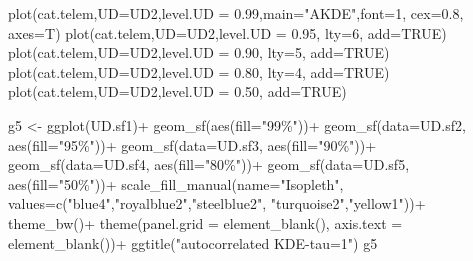 \documentclass[
  letterpaper,
]{book}
\newenvironment{Shaded}{\begin{snugshade}}{\end{snugshade}}
\newcommand{\AttributeTok}[1]{\textcolor[rgb]{0.40,0.45,0.13}{#1}}
\newcommand{\ConstantTok}[1]{\textcolor[rgb]{0.56,0.35,0.01}{#1}}
\newcommand{\DecValTok}[1]{\textcolor[rgb]{0.68,0.00,0.00}{#1}}
\newcommand{\FloatTok}[1]{\textcolor[rgb]{0.68,0.00,0.00}{#1}}
\newcommand{\FunctionTok}[1]{\textcolor[rgb]{0.28,0.35,0.67}{#1}}
\newcommand{\NormalTok}[1]{\textcolor[rgb]{0.00,0.23,0.31}{#1}}
\newcommand{\OtherTok}[1]{\textcolor[rgb]{0.00,0.23,0.31}{#1}}
\newcommand{\SpecialCharTok}[1]{\textcolor[rgb]{0.37,0.37,0.37}{#1}}
\newcommand{\StringTok}[1]{\textcolor[rgb]{0.13,0.47,0.30}{#1}}
\begin{document}
\begin{Shaded}
\begin{Highlighting}[]
\FunctionTok{plot}\NormalTok{(cat.telem,}\AttributeTok{UD=}\NormalTok{UD2,}\AttributeTok{level.UD =} \FloatTok{0.99}\NormalTok{,}\AttributeTok{main=}\StringTok{"AKDE"}\NormalTok{,}\AttributeTok{font=}\DecValTok{1}\NormalTok{, }\AttributeTok{cex=}\FloatTok{0.8}\NormalTok{, }\AttributeTok{axes=}\NormalTok{T)}
\FunctionTok{plot}\NormalTok{(cat.telem,}\AttributeTok{UD=}\NormalTok{UD2,}\AttributeTok{level.UD =} \FloatTok{0.95}\NormalTok{, }\AttributeTok{lty=}\DecValTok{6}\NormalTok{, }\AttributeTok{add=}\ConstantTok{TRUE}\NormalTok{)}
\FunctionTok{plot}\NormalTok{(cat.telem,}\AttributeTok{UD=}\NormalTok{UD2,}\AttributeTok{level.UD =} \FloatTok{0.90}\NormalTok{, }\AttributeTok{lty=}\DecValTok{5}\NormalTok{, }\AttributeTok{add=}\ConstantTok{TRUE}\NormalTok{)}
\FunctionTok{plot}\NormalTok{(cat.telem,}\AttributeTok{UD=}\NormalTok{UD2,}\AttributeTok{level.UD =} \FloatTok{0.80}\NormalTok{, }\AttributeTok{lty=}\DecValTok{4}\NormalTok{, }\AttributeTok{add=}\ConstantTok{TRUE}\NormalTok{)}
\FunctionTok{plot}\NormalTok{(cat.telem,}\AttributeTok{UD=}\NormalTok{UD2,}\AttributeTok{level.UD =} \FloatTok{0.50}\NormalTok{, }\AttributeTok{add=}\ConstantTok{TRUE}\NormalTok{)}

\NormalTok{g5 }\OtherTok{\textless{}{-}} \FunctionTok{ggplot}\NormalTok{(UD.sf1)}\SpecialCharTok{+}
  \FunctionTok{geom\_sf}\NormalTok{(}\FunctionTok{aes}\NormalTok{(}\AttributeTok{fill=}\StringTok{"99\%"}\NormalTok{))}\SpecialCharTok{+}
  \FunctionTok{geom\_sf}\NormalTok{(}\AttributeTok{data=}\NormalTok{UD.sf2, }\FunctionTok{aes}\NormalTok{(}\AttributeTok{fill=}\StringTok{"95\%"}\NormalTok{))}\SpecialCharTok{+} 
  \FunctionTok{geom\_sf}\NormalTok{(}\AttributeTok{data=}\NormalTok{UD.sf3, }\FunctionTok{aes}\NormalTok{(}\AttributeTok{fill=}\StringTok{"90\%"}\NormalTok{))}\SpecialCharTok{+}
  \FunctionTok{geom\_sf}\NormalTok{(}\AttributeTok{data=}\NormalTok{UD.sf4, }\FunctionTok{aes}\NormalTok{(}\AttributeTok{fill=}\StringTok{"80\%"}\NormalTok{))}\SpecialCharTok{+}
  \FunctionTok{geom\_sf}\NormalTok{(}\AttributeTok{data=}\NormalTok{UD.sf5, }\FunctionTok{aes}\NormalTok{(}\AttributeTok{fill=}\StringTok{"50\%"}\NormalTok{))}\SpecialCharTok{+}
  \FunctionTok{scale\_fill\_manual}\NormalTok{(}\AttributeTok{name=}\StringTok{"Isopleth"}\NormalTok{, }\AttributeTok{values=}\FunctionTok{c}\NormalTok{(}\StringTok{"blue4"}\NormalTok{,}\StringTok{"royalblue2"}\NormalTok{,}\StringTok{"steelblue2"}\NormalTok{, }\StringTok{"turquoise2"}\NormalTok{,}\StringTok{"yellow1"}\NormalTok{))}\SpecialCharTok{+}
  \FunctionTok{theme\_bw}\NormalTok{()}\SpecialCharTok{+}
  \FunctionTok{theme}\NormalTok{(}\AttributeTok{panel.grid =} \FunctionTok{element\_blank}\NormalTok{(), }\AttributeTok{axis.text =} \FunctionTok{element\_blank}\NormalTok{())}\SpecialCharTok{+}
  \FunctionTok{ggtitle}\NormalTok{(}\StringTok{"autocorrelated KDE{-}tau=1"}\NormalTok{)}
\NormalTok{g5}
\end{Highlighting}
\end{Shaded}
\end{document}
